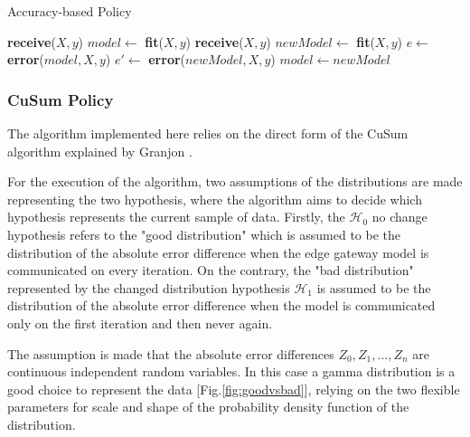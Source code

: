 \documentclass{mpaper}
\begin{document}

\begin{algorithm}[h]
\caption{Accuracy-based Policy}\label{polA}
\begin{algorithmic}
\State  \textbf{receive}($X, y$)
\State $model \gets$ \textbf{fit}($X,y$)
    \State \textbf{receive}($X, y$)
    \State $newModel \gets$ \textbf{fit}($X,y$)
    \State $e \gets$ \textbf{error}($model, X, y$)
    \State $e' \gets$ \textbf{error}($newModel, X, y$)
        \State $model \gets newModel$ 
    \EndIf
\EndWhile
\end{algorithmic}
\end{algorithm}

\subsubsection{CuSum Policy}
The algorithm implemented here relies on the direct form of the CuSum algorithm explained by Granjon \cite{cusum_pierre}.

For the execution of the algorithm, two assumptions of the distributions are made representing the two hypothesis, where the algorithm aims to decide which hypothesis represents the current sample of data. 
Firstly, the $\mathcal{H}_0$ no change hypothesis refers to the "good distribution" which is assumed to be the distribution of the absolute error difference when the edge gateway model is communicated on every iteration. On the contrary, the "bad distribution" represented by the changed distribution hypothesis $\mathcal{H}_1$ is assumed to be the distribution of the absolute error difference when the model is communicated only on the first iteration and then never again.

The assumption is made that the absolute error differences $Z_0, Z_1, \dotsc , Z_n $ are continuous independent random variables. In this case a gamma distribution is a good choice to represent the data  [Fig.\ref{fig:goodvsbad}], relying on the two flexible parameters for scale and shape of the probability density function of the distribution.
\end{document}
